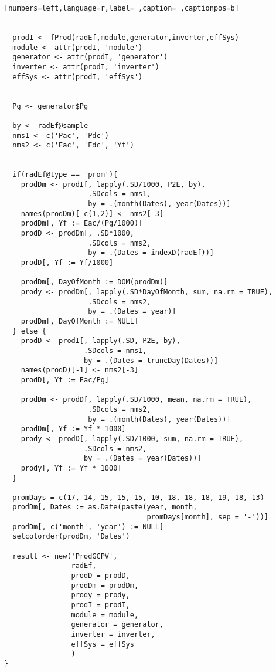 \begin{lstlisting}[numbers=left,language=r,label= ,caption= ,captionpos=b]
  
  
  prodI <- fProd(radEf,module,generator,inverter,effSys)
  module <- attr(prodI, 'module')
  generator <- attr(prodI, 'generator')
  inverter <- attr(prodI, 'inverter')
  effSys <- attr(prodI, 'effSys')
  
  
  Pg <- generator$Pg 
  
  by <- radEf@sample
  nms1 <- c('Pac', 'Pdc')
  nms2 <- c('Eac', 'Edc', 'Yf')
  
  
  if(radEf@type == 'prom'){
    prodDm <- prodI[, lapply(.SD/1000, P2E, by),
                    .SDcols = nms1,
                    by = .(month(Dates), year(Dates))]
    names(prodDm)[-c(1,2)] <- nms2[-3]
    prodDm[, Yf := Eac/(Pg/1000)]
    prodD <- prodDm[, .SD*1000,
                    .SDcols = nms2,
                    by = .(Dates = indexD(radEf))]
    prodD[, Yf := Yf/1000]
    
    prodDm[, DayOfMonth := DOM(prodDm)]
    prody <- prodDm[, lapply(.SD*DayOfMonth, sum, na.rm = TRUE),
                    .SDcols = nms2,
                    by = .(Dates = year)]
    prodDm[, DayOfMonth := NULL]
  } else {
    prodD <- prodI[, lapply(.SD, P2E, by),
                   .SDcols = nms1,
                   by = .(Dates = truncDay(Dates))]
    names(prodD)[-1] <- nms2[-3]
    prodD[, Yf := Eac/Pg]

    prodDm <- prodD[, lapply(.SD/1000, mean, na.rm = TRUE),
                    .SDcols = nms2,
                    by = .(month(Dates), year(Dates))]
    prodDm[, Yf := Yf * 1000]
    prody <- prodD[, lapply(.SD/1000, sum, na.rm = TRUE),
                   .SDcols = nms2,
                   by = .(Dates = year(Dates))]
    prody[, Yf := Yf * 1000]
  }
  
  promDays = c(17, 14, 15, 15, 15, 10, 18, 18, 18, 19, 18, 13)
  prodDm[, Dates := as.Date(paste(year, month,
                                  promDays[month], sep = '-'))]
  prodDm[, c('month', 'year') := NULL]
  setcolorder(prodDm, 'Dates')
  
  result <- new('ProdGCPV',
                radEf,                  
                prodD = prodD,
                prodDm = prodDm,
                prody = prody,
                prodI = prodI,
                module = module,
                generator = generator,
                inverter = inverter,
                effSys = effSys
                )
}
\end{lstlisting}
